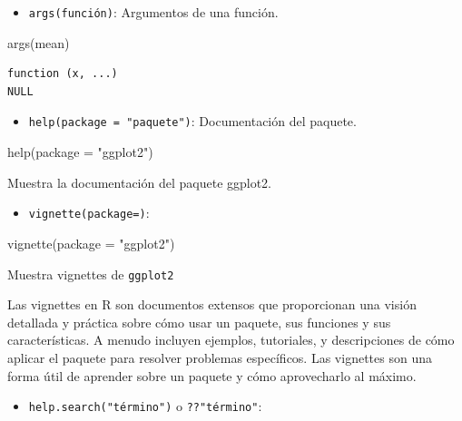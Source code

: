\documentclass[
  letterpaper,
  DIV=11,
  numbers=noendperiod]{scrreprt}
\newenvironment{Shaded}{\begin{snugshade}}{\end{snugshade}}
\newcommand{\AttributeTok}[1]{\textcolor[rgb]{0.40,0.45,0.13}{#1}}
\newcommand{\FunctionTok}[1]{\textcolor[rgb]{0.28,0.35,0.67}{#1}}
\newcommand{\NormalTok}[1]{\textcolor[rgb]{0.00,0.23,0.31}{#1}}
\newcommand{\StringTok}[1]{\textcolor[rgb]{0.13,0.47,0.30}{#1}}
\providecommand{\tightlist}{%
  \setlength{\itemsep}{0pt}\setlength{\parskip}{0pt}}\usepackage{longtable,booktabs,array}
\begin{document}
\begin{itemize}
\tightlist
\item
  \texttt{args(función)}: Argumentos de una función.
\end{itemize}

\begin{Shaded}
\begin{Highlighting}[]
\FunctionTok{args}\NormalTok{(mean)}
\end{Highlighting}
\end{Shaded}

\begin{verbatim}
function (x, ...) 
NULL
\end{verbatim}

\begin{itemize}
\tightlist
\item
  \texttt{help(package\ =\ "paquete")}: Documentación del paquete.
\end{itemize}

\begin{Shaded}
\begin{Highlighting}[]
\FunctionTok{help}\NormalTok{(}\AttributeTok{package =} \StringTok{"ggplot2"}\NormalTok{)}
\end{Highlighting}
\end{Shaded}

Muestra la documentación del paquete ggplot2.

\begin{itemize}
\tightlist
\item
  \texttt{vignette(package=)}:
\end{itemize}

\begin{Shaded}
\begin{Highlighting}[]
\FunctionTok{vignette}\NormalTok{(}\AttributeTok{package =} \StringTok{"ggplot2"}\NormalTok{)}
\end{Highlighting}
\end{Shaded}

Muestra vignettes de \texttt{ggplot2}

Las vignettes en R son documentos extensos que proporcionan una visión
detallada y práctica sobre cómo usar un paquete, sus funciones y sus
características. A menudo incluyen ejemplos, tutoriales, y descripciones
de cómo aplicar el paquete para resolver problemas específicos. Las
vignettes son una forma útil de aprender sobre un paquete y cómo
aprovecharlo al máximo.

\begin{itemize}
\tightlist
\item
  \texttt{help.search("término")} o \texttt{??"término"}:
\end{itemize}
\end{document}
